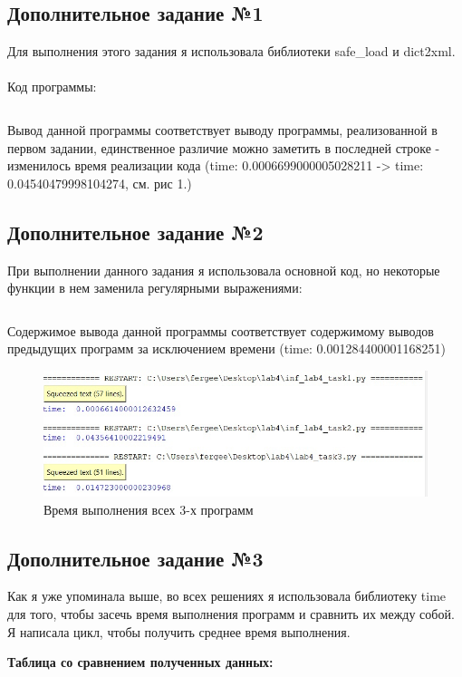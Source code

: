 \documentclass[12pt]{article}
\begin{document}
\subsection{Дополнительное задание №1}

Для выполнения этого задания я использовала библиотеки safe\_load и dict2xml. \\
\\Код программы:
\inputminted{python}{task2.py}
Вывод данной программы соответствует выводу программы, реализованной в первом задании, единственное различие можно заметить в последней строке - изменилось время реализации кода  (time:  0.0006699000005028211 -> time:  0.04540479998104274, см. рис 1.)
\newpage
\subsection{Дополнительное задание №2}

При выполнении данного задания я использовала основной код, но некоторые функции в нем заменила регулярными выражениями:
\inputminted{python}{lab4_task3add.py}
\newpage
Содержимое вывода данной программы соответствует содержимому выводов предыдущих программ за исключением времени (time:  0.001284400001168251)
\\
\begin{figure}[h]
    \centering
    \includegraphics[width=17cm]{ris_1.jpg}
    \caption{Время выполнения всех 3-х программ}
\end{figure}

\subsection{Дополнительное задание №3}

Как я уже упоминала выше, во всех решениях я использовала библиотеку time для того, чтобы засечь время выполнения программ и сравнить их между собой. Я написала цикл, чтобы получить среднее время выполнения.  

\begin{center}
\textbf{	Таблица со сравнением полученных данных:}
\\
\end{center}
\end{document}

